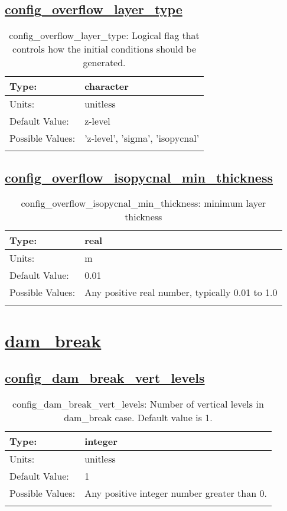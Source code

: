 \subsection[config\_overflow\_layer\_type]{\hyperref[sec:nm_tab_overflow]{config\_overflow\_layer\_type}}
\label{subsec:nm_sec_config_overflow_layer_type}
\begin{center}
\begin{longtable}{| p{2.0in} || p{4.0in} |}
    \hline
    Type: & character \\
    \hline
    Units: & \si{unitless} \\
    \hline
    Default Value: & z-level \\
    \hline
    Possible Values: & 'z-level', 'sigma', 'isopycnal' \\
    \hline
    \caption{config\_overflow\_layer\_type: Logical flag that controls how the initial conditions should be generated.}
\end{longtable}
\end{center}
\subsection[config\_overflow\_isopycnal\_min\_thickness]{\hyperref[sec:nm_tab_overflow]{config\_overflow\_isopycnal\_min\_thickness}}
\label{subsec:nm_sec_config_overflow_isopycnal_min_thickness}
\begin{center}
\begin{longtable}{| p{2.0in} || p{4.0in} |}
    \hline
    Type: & real \\
    \hline
    Units: & \si{m} \\
    \hline
    Default Value: & 0.01 \\
    \hline
    Possible Values: & Any positive real number, typically 0.01 to 1.0 \\
    \hline
    \caption{config\_overflow\_isopycnal\_min\_thickness: minimum layer thickness}
\end{longtable}
\end{center}
\section[dam\_break]{\hyperref[sec:nm_tab_dam_break]{dam\_break}}
\label{sec:nm_sec_dam_break}
\subsection[config\_dam\_break\_vert\_levels]{\hyperref[sec:nm_tab_dam_break]{config\_dam\_break\_vert\_levels}}
\label{subsec:nm_sec_config_dam_break_vert_levels}
\begin{center}
\begin{longtable}{| p{2.0in} || p{4.0in} |}
    \hline
    Type: & integer \\
    \hline
    Units: & \si{unitless} \\
    \hline
    Default Value: & 1 \\
    \hline
    Possible Values: & Any positive integer number greater than 0. \\
    \hline
    \caption{config\_dam\_break\_vert\_levels: Number of vertical levels in dam\_break case. Default value is 1.}
\end{longtable}
\end{center}
